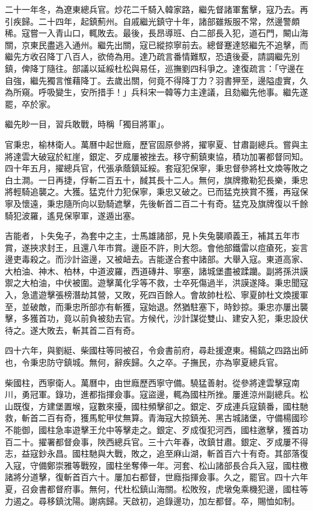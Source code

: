 \begin{pinyinscope}
二十一年冬，為遼東總兵官。炒花二千騎入韓家路，繼先督諸軍奮擊，寇乃去。再引疾歸。二十四年，起鎮薊州。自戚繼光鎮守十年，諸部雖叛服不常，然邊警頗稀。寇嘗一入青山口，輒敗去。最後，長昂導班、白二部長入犯，道石門，闞山海關，京東民盡逃入通州。繼先出關，寇已縱掠寧前去。總督蹇達怒繼先不追擊，而繼先方收召降丁八百人，欲倚為用。達乃疏言番情難馭，恐遺後憂，請調繼先別鎮，俾降丁隨往。部議以延綏杜松與易任，巡撫劉四科爭之。達復疏言：「守邊在自強，繼先獨言惟藉降丁。去歲出關，何竟不得降丁力？羽書狎至，邊隘虛實，久為所窺。呼吸變生，安所措手！」兵科宋一韓等力主達議，且劾繼先他事。繼先遂罷，卒於家。

繼先眇一目，習兵敢戰，時稱「獨目將軍」。

官秉忠，榆林衛人。萬曆中起世廕，歷官固原參將，擢寧夏、甘肅副總兵。嘗與主將達雲大破寇於紅崖，銀定、歹成屢被挫去。移守薊鎮東協，積功加署都督同知。四十年五月，擢總兵官，代張承蔭鎮延綏。套寇犯保寧，秉忠督參將杜文煥等敗之白土澗。一日再捷，俘斬二百五十，馘其長十二人。無何，旗牌撒勒犯長樂，秉忠將輕騎追襲之。大獲。猛克什力犯保寧，秉忠又破之。已而猛克挾賞不獲，再寇保寧及懷遠，秉忠隨所向以勁騎遮擊，先後斬首二百二十有奇。猛克及旗牌復以千餘騎犯波羅，遙見保寧軍，遂遁出塞。

吉能者，卜失兔子，為套中之主，士馬雄諸部，見卜失兔襲順義王，補其五年市賞，遂挾求封王，且還八年市賞。邊臣不許，則大怨。會他部鐵雷以痘瘡死，妄言邊吏毒殺之。而沙計盜邊，又被衄去。吉能遂合套中諸部。大舉入寇。東道高家、大柏油、神木、柏林，中道波羅，西道磚井、寧塞，諸城堡盡被蹂躪。副將孫洪謨禦之大柏油，中伏被圍。遊擊萬化孚等不救，士卒死傷過半，洪謨遂降。秉忠聞寇入，急遣遊擊張榜潛劫其營，又敗，死四百餘人。會故帥杜松、寧夏帥杜文煥援軍至，並破敵，而秉忠所部亦有斬獲，寇始退。然猶駐塞下，時鈔掠。秉忠亦屢出襲擊，多獲首功，竟以前負被劾去官。方候代，沙計謀從雙山、建安入犯，秉忠設伏待之。遂大敗去，斬其首二百有奇。

四十六年，與劉綎、柴國柱等同被召，令僉書前府，尋赴援遼東。楊鎬之四路出師也，令秉忠防守鎮城。無何，辭疾歸。久之卒。子撫民，亦為寧夏總兵官。

柴國柱，西寧衛人。萬曆中，由世廕歷西寧守備。驍猛善射。從參將達雲擊寇南川，勇冠軍。錄功，進都指揮僉事。寇盜邊，輒為國柱所挫。屢進涼州副總兵。松山既復，方建堡置堠，寇數來擾，國柱頻擊卻之。銀定、歹成連兵寇鎮番，國柱馳救，斬首二百有奇，獲馬駝甲仗無算。青海寇大掠鎮羌、黑古城諸堡，守備楊國珍不能御，國柱急率遊擊王允中等擊走之。銀定、歹成復犯河西，國柱邀擊，獲首功百二十。擢署都督僉事，陜西總兵官。三十六年春，改鎮甘肅。銀定、歹成屢不得志，益寇鈔永昌。國柱馳與大戰，敗之，追至麻山湖，斬首百六十有奇。其部落復入寇，守備鄭崇雅等戰歿，國柱坐奪俸一年。河套、松山諸部長合兵入寇，國柱檄諸將分道擊，復斬首百六十。屢加右都督，世廕指揮僉事。久之，罷官。四十六年夏，召僉書都督府事。無何，代杜松鎮山海關。松敗歿，虎墩兔乘機犯邊，國柱等力遏之。尋移鎮沈陽。謝病歸。天啟初，追錄邊功，加左都督。卒，賜恤如制。


\end{pinyinscope}
